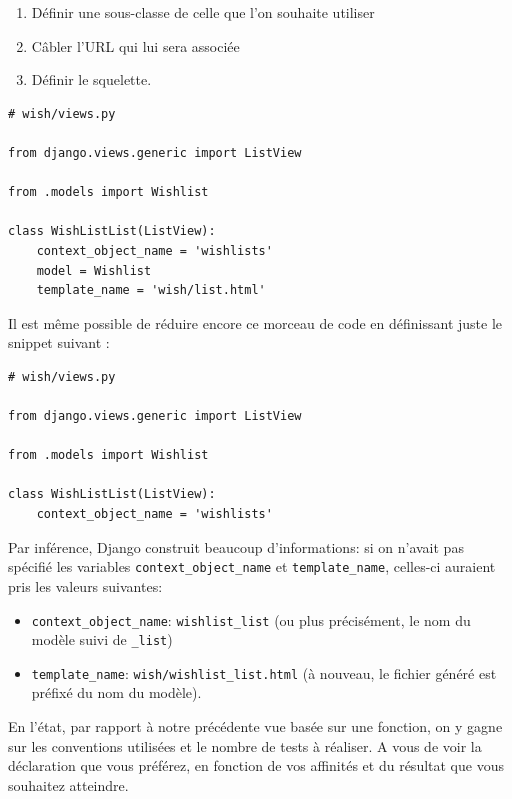 \documentclass[11pt]{amsbook}
\begin{document}
\begin{enumerate}

\item{Définir une sous-classe de celle que l’on souhaite utiliser}

\item{Câbler l’URL qui lui sera associée}

\item{Définir le squelette.}

\end{enumerate}


\begin{verbatim}
# wish/views.py

from django.views.generic import ListView

from .models import Wishlist

class WishListList(ListView):
	context_object_name = 'wishlists'
	model = Wishlist
	template_name = 'wish/list.html'
\end{verbatim}

Il est même possible de réduire encore ce morceau de code en définissant juste le snippet suivant :


\begin{verbatim}
# wish/views.py

from django.views.generic import ListView

from .models import Wishlist

class WishListList(ListView):
	context_object_name = 'wishlists'
\end{verbatim}

Par inférence, Django construit beaucoup d’informations: si on n’avait pas spécifié les variables \texttt{context\_object\_name} et \texttt{template\_name}, celles-ci auraient pris les valeurs suivantes:


\begin{itemize}

\item \texttt{context\_object\_name}: \texttt{wishlist\_list} (ou plus précisément, le nom du modèle suivi de \texttt{\_list})

\item \texttt{template\_name}: \texttt{wish/wishlist\_list.html} (à nouveau, le fichier généré est préfixé du nom du modèle).

\end{itemize}


En l’état, par rapport à notre précédente vue basée sur une fonction, on y gagne sur les conventions utilisées et le nombre de tests à réaliser. A vous de voir la déclaration que vous préférez, en fonction de vos affinités et du résultat que vous souhaitez atteindre.
\end{document}
